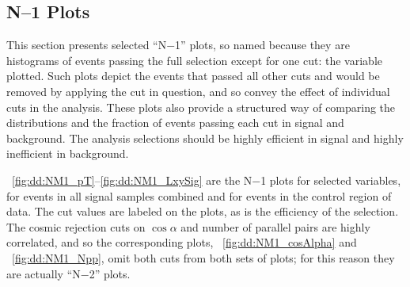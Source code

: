 \subsection{N--1 Plots}
This section presents selected ``N$-$1'' plots, so named because they are histograms of events passing the full selection except for one cut: the variable plotted.
Such plots depict the events that passed all other cuts and would be removed by applying the cut in question, and so convey the effect of individual cuts in the analysis.
These plots also provide a structured way of comparing the distributions and the fraction of events passing each cut in signal and background.
The analysis selections should be highly efficient in signal and highly inefficient in background.

\Figs~\ref{fig:dd:NM1_pT}--\ref{fig:dd:NM1_LxySig} are the N$-$1 plots for selected variables, for events in all \twoMu signal samples combined and for events in the control region  of data.
The cut values are labeled on the plots, as is the efficiency of the selection.
The cosmic rejection cuts on $\cos{\alpha}$ and number of parallel pairs are highly correlated, and so the corresponding plots, \Fig~\ref{fig:dd:NM1_cosAlpha} and \Fig~\ref{fig:dd:NM1_Npp}, omit both cuts from both sets of plots; for this reason they are actually ``N$-$2'' plots.

